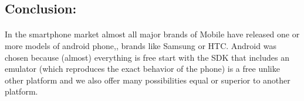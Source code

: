 \subsection{Conclusion: }
\paragraph{} In the smartphone market almost all major brands of Mobile have released one or more models of android phone,, brands like Samsung or HTC.
Android was chosen because (almost) everything is free start with the SDK that includes an emulator (which reproduces the exact behavior of the phone) is
 a free unlike other platform and we also offer many possibilities equal or superior to another platform.\par
